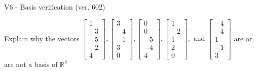 \begin{exercise}
  \begin{exerciseTitle}V6 - Basis verification (ver. 602)\end{exerciseTitle}
  \begin{exerciseStatement}
    Explain why the vectors \(\left[\begin{array}{r}
1 \\
-3 \\
-5 \\
-2 \\
4
\end{array}\right] , \left[\begin{array}{r}
3 \\
-4 \\
-1 \\
3 \\
0
\end{array}\right] , \left[\begin{array}{r}
0 \\
0 \\
-5 \\
-4 \\
4
\end{array}\right] , \left[\begin{array}{r}
1 \\
-2 \\
1 \\
2 \\
0
\end{array}\right] , \text{ and } \left[\begin{array}{r}
-4 \\
-4 \\
1 \\
-1 \\
3
\end{array}\right]\) are or are not a basis of \(\mathbb{R}^5\)	



\end{exerciseStatement}
\end{exercise}
